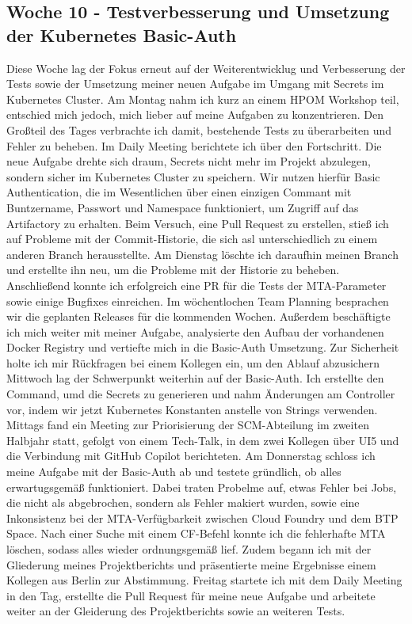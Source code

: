 \subsection{Woche 10 - Testverbesserung und Umsetzung der Kubernetes Basic-Auth}
Diese Woche lag der Fokus erneut auf der Weiterentwicklug und Verbesserung der Tests sowie der Umsetzung meiner neuen
Aufgabe im Umgang mit Secrets im Kubernetes Cluster.
Am Montag nahm ich kurz an einem HPOM Workshop teil, entschied mich jedoch, mich lieber auf meine Aufgaben zu konzentrieren.
Den Großteil des Tages verbrachte ich damit, bestehende Tests zu überarbeiten und Fehler zu beheben.
Im Daily Meeting berichtete ich über den Fortschritt.
Die neue Aufgabe drehte sich draum, Secrets nicht mehr im Projekt abzulegen, sondern sicher im Kubernetes Cluster zu speichern.
Wir nutzen hierfür Basic Authentication, die im Wesentlichen über einen einzigen Commant mit Buntzername, Passwort und
Namespace funktioniert, um Zugriff auf das Artifactory zu erhalten.
Beim Versuch, eine Pull Request zu erstellen, stieß ich auf Probleme mit der Commit-Historie, die sich asl unterschiedlich
zu einem anderen Branch herausstellte.
Am Dienstag löschte ich daraufhin meinen Branch und erstellte ihn neu, um die Probleme mit der Historie zu beheben.
Anschließend konnte ich erfolgreich eine PR für die Tests der MTA-Parameter sowie einige Bugfixes einreichen.
Im wöchentlochen Team Planning besprachen wir die geplanten Releases für die kommenden Wochen.
Außerdem beschäftigte ich mich weiter mit meiner Aufgabe, analysierte den Aufbau der vorhandenen Docker Registry und vertiefte
mich in die Basic-Auth Umsetzung.
Zur Sicherheit holte ich mir Rückfragen bei einem Kollegen ein, um den Ablauf abzusichern
Mittwoch lag der Schwerpunkt weiterhin auf der Basic-Auth.
Ich erstellte den Command, umd die Secrets zu generieren und nahm Änderungen am Controller vor, indem wir jetzt Kubernetes
Konstanten anstelle von Strings verwenden.
Mittags fand ein Meeting zur Priorisierung der SCM-Abteilung im zweiten Halbjahr statt, gefolgt von einem Tech-Talk, in dem
zwei Kollegen über UI5 und die Verbindung mit GitHub Copilot berichteten.
Am Donnerstag schloss ich meine Aufgabe mit der Basic-Auth ab und testete gründlich, ob alles erwartugsgemäß funktioniert.
Dabei traten Probelme auf, etwas Fehler bei Jobs, die nicht als abgebrochen, sondern als Fehler makiert wurden, sowie eine
Inkonsistenz bei der MTA-Verfügbarkeit zwischen Cloud Foundry und dem BTP Space.
Nach einer Suche mit einem CF-Befehl konnte ich die fehlerhafte MTA löschen, sodass alles wieder ordnungsgemäß lief.
Zudem begann ich mit der Gliederung meines Projektberichts und präsentierte meine Ergebnisse einem Kollegen aus Berlin zur Abstimmung.
Freitag startete ich mit dem Daily Meeting in den Tag, erstellte die Pull Request für meine neue Aufgabe und arbeitete weiter
an der Gleiderung des Projektberichts sowie an weiteren Tests.

